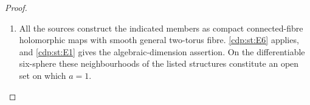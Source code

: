 \begin{proof}
\begin{enumerate}[label={$\langle1\rangle$\arabic*.},leftmargin=*]
\item All the sources construct the indicated members as compact
connected-fibre holomorphic maps with smooth general two-torus
fibre. \ref{cdp:st:E6} applies, and \ref{cdp:st:E1} gives the algebraic-dimension assertion.
On the differentiable six-sphere these neighbourhoods of the
listed structures constitute an open set on which $a=1$.

\end{enumerate}
\end{proof}